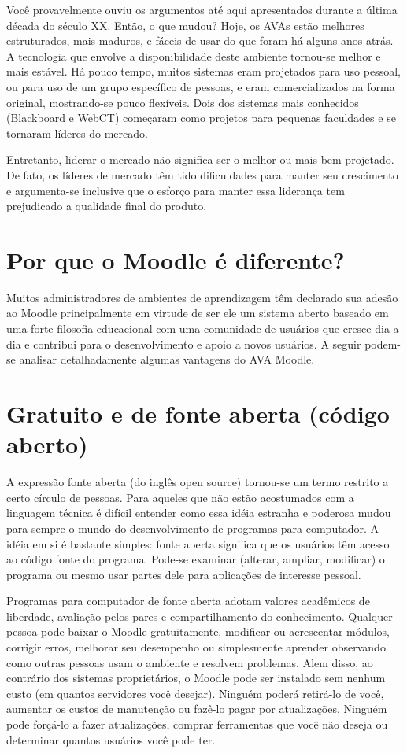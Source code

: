 Você provavelmente ouviu os argumentos até aqui apresentados durante a última década do século XX. Então, o que mudou? Hoje, os AVAs estão melhores estruturados, mais maduros, e fáceis de usar do que foram há alguns anos atrás. A tecnologia que envolve a disponibilidade deste ambiente tornou-se melhor e mais estável. Há pouco tempo, muitos sistemas eram projetados para uso pessoal, ou para uso de um grupo específico de pessoas, e eram comercializados na forma original, mostrando-se pouco flexíveis. Dois dos sistemas mais conhecidos (Blackboard e WebCT) começaram como projetos para pequenas faculdades e se tornaram líderes do mercado.

Entretanto, liderar o mercado não significa ser o melhor ou mais bem projetado. De fato, os líderes de mercado têm tido dificuldades para manter seu crescimento e argumenta-se inclusive que o esforço para manter essa liderança tem prejudicado a qualidade final do produto.



\section{Por que o Moodle é diferente?}

Muitos administradores de ambientes de aprendizagem têm declarado sua adesão ao Moodle principalmente em virtude de ser ele um sistema aberto baseado em uma forte filosofia educacional com uma comunidade de usuários que cresce dia a dia e contribui para o desenvolvimento e apoio a novos usuários. A seguir podem-se analisar detalhadamente algumas vantagens do AVA Moodle.

\section{Gratuito e de fonte aberta (código aberto)}

A expressão fonte aberta (do inglês open source) tornou-se um termo restrito a certo círculo de pessoas. Para aqueles que não estão acostumados com a linguagem técnica é difícil entender como essa idéia estranha e poderosa mudou para sempre o mundo do desenvolvimento de programas para computador. A idéia em si é bastante simples: fonte aberta significa que os usuários têm acesso ao código fonte do programa. Pode-se examinar (alterar, ampliar, modificar) o programa ou mesmo usar partes dele para aplicações de interesse pessoal.

Programas para computador de fonte aberta adotam valores acadêmicos de liberdade, avaliação pelos pares e compartilhamento do conhecimento. Qualquer pessoa pode baixar o Moodle gratuitamente, modificar ou acrescentar módulos, corrigir erros, melhorar seu desempenho ou simplesmente aprender observando como outras pessoas usam o ambiente e resolvem problemas. Alem disso, ao contrário dos sistemas proprietários, o Moodle pode ser instalado sem nenhum custo (em quantos servidores você desejar). Ninguém poderá retirá-lo de você, aumentar os custos de manutenção ou fazê-lo pagar por atualizações. Ninguém pode forçá-lo a fazer atualizações, comprar ferramentas que você não deseja ou determinar quantos usuários você pode ter.


